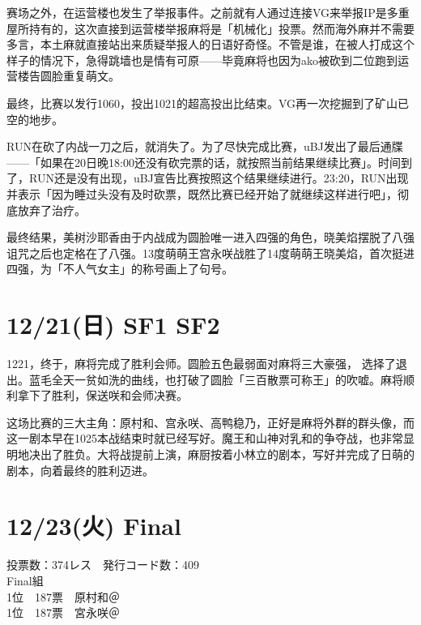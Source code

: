赛场之外，在运营楼也发生了举报事件。之前就有人通过连接VG来举报IP是多重屋所持有的，这次直接到运营楼举报麻将是「机械化」投票。然而海外麻并不需要多言，本土麻就直接站出来质疑举报人的日语好奇怪。不管是谁，在被人打成这个样子的情况下，急得跳墙也是情有可原——毕竟麻将也因为ako被砍到二位跑到运营楼告圆脸重复萌文。

最终，比赛以发行1060，投出1021的超高投出比结束。VG再一次挖掘到了矿山已空的地步。

RUN在砍了内战一刀之后，就消失了。为了尽快完成比赛，uBJ发出了最后通牒——「如果在20日晚18:00还没有砍完票的话，就按照当前结果继续比赛」。时间到了，RUN还是没有出现，uBJ宣告比赛按照这个结果继续进行。23:20，RUN出现并表示「因为睡过头没有及时砍票，既然比赛已经开始了就继续这样进行吧」，彻底放弃了治疗。

最终结果，美树沙耶香由于内战成为圆脸唯一进入四强的角色，晓美焰摆脱了八强诅咒之后也定格在了八强。13度萌萌王宫永咲战胜了14度萌萌王晓美焰，首次挺进四强，为「不人气女主」的称号画上了句号。

\section{12/21(日) SF1 SF2}



1221，终于，麻将完成了胜利会师。圆脸五色最弱面对麻将三大豪强， 选择了退出。蓝毛全天一贫如洗的曲线，也打破了圆脸「三百散票可称王」的吹嘘。麻将顺利拿下了胜利，保送咲和会师决赛。

这场比赛的三大主角：原村和、宫永咲、高鸭稳乃，正好是麻将外群的群头像，而这一剧本早在1025本战结束时就已经写好。魔王和山神对乳和的争夺战，也非常显明地决出了胜负。大将战提前上演，麻厨按着小林立的剧本，写好并完成了日萌的剧本，向着最终的胜利迈进。

\section{12/23(火) Final}

\begin{minipage}[t]{.45\textwidth}\VoteFont
  投票数：374レス　発行コード数：409\\
  Final組\\
  1位　187票　原村和＠\Saki\\
  1位　187票　宮永咲＠\Saki
\end{minipage}

